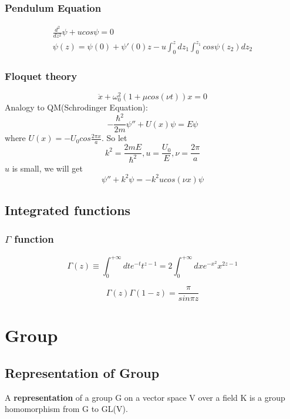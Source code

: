 \subsubsection{Pendulum Equation}
\begin{equation}
    \begin{gathered}
	\frac{d^2}{dz^2}\psi + ucos\psi = 0 \\
	\psi(z) = \psi(0) + \psi'(0)z - u\int_0^z dz_1 \int_0^{z_1}cos\psi(z_2)dz_2
    \end{gathered}
\end{equation}
\subsubsection{Floquet theory}
\begin{equation}
    \ddot{x} + \omega_{0}^{2}(1+\mu cos(\nu t))x = 0
\end{equation}
Analogy to QM(Schrodinger Equation):	
\[
    -\frac{\hbar^{2}}{2m}{\psi''} + U(x)\psi = E\psi
    \]
where $U(x) = -U_{0}cos\frac{2\pi x}{a}$.
So let 
\[
    k^{2} = \frac{2mE}{\hbar^{2}}, u=\frac{U_0}{E}, \nu=\frac{2\pi}{a}
    \]
$u$ is small, we will get   
\[ 
    \psi''+k^{2}\psi = -k^{2}ucos(\nu x)\psi
    \]

\subsection{Integrated functions}
\subsubsection{$\Gamma$ function}
\[\Gamma(z) \equiv \int_{0}^{+\infty}dt e^{-t} t^{z-1} =
2\int_{0}^{+\infty}dx e^{-x^2}x^{2z-1}\]

\[\Gamma(z)\Gamma(1-z) = \frac{\pi}{sin\pi z}\]

\section{Group}

\subsection{Representation of Group}
A \textbf{representation} of a group G on a vector space V over a field K is
a group homomorphism from G to GL(V).

